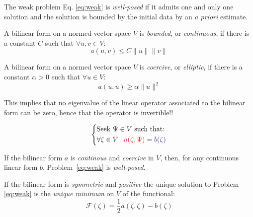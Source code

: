 \begin{defin}\label{def:hadamard}
  The weak problem Eq. \eqref{eq:weak} is \emph{well-posed} if it
  admits one and only one solution and the solution is bounded by
  the initial data by an \emph{a priori} estimate.
\end{defin}
\begin{defin}[Continuity]\label{def:continuity}
  A bilinear form on a normed vector space $V$ is \emph{bounded}, or
  \emph{continuous}, if there is a constant $C$ such that
  $\forall u, v \in V$:
  \[
  a(u, v) \leq C\lVert u\rVert\lVert v\rVert
  \]
\end{defin}
\begin{defin}[Coercivity]\label{def:coercivity}
  A bilinear form on a normed vector space $V$ is \emph{coercive},
  or \emph{elliptic}, if there is a constant $\alpha >0$ such that
  $\forall u \in V$:
  \[
  a(u, u) \geq \alpha\lVert u\rVert^2
  \]
\end{defin}
This implies that no eigenvalue of the linear operator associated
to the bilinear form can be zero, hence that the operator is
invertible!!~\autocite{Ern2004-oo}

\begin{equation}
  \left\{
  \begin{aligned}
    &\text{Seek $\Psi \in V$ such that:}\\
    &\forall \zeta \in V \,\,\,\,\,
    \mathcolor{Red}{a(\zeta, \Psi)} = \mathcolor{Blue}{b(\zeta)}
  \end{aligned}
  \right.
\end{equation}
\begin{lemma}
  If the bilinear form $a$ is \emph{continous} and \emph{coercive}
  in $V$, then, for any continuous linear form $b$, Problem~\eqref{eq:weak} is
  \emph{well-posed}.
\end{lemma}
\begin{corollary}
  If the bilinear form is \emph{symmetric} and \emph{positive}
  the unique solution to Problem \eqref{eq:weak} is
  the \emph{unique minimum} on $V$ of the functional:
  \[
  \mathcal{F}(\zeta) = \frac{1}{2}a(\zeta, \zeta) - b(\zeta)
  \]
\end{corollary}

